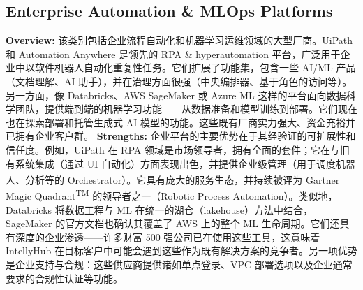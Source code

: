\documentclass[11pt, a4paper, oneside]{article}
\begin{document}
\subsection{Enterprise Automation \& MLOps Platforms}
\textbf{Overview:} 该类别包括企业流程自动化和机器学习运维领域的大型厂商。UiPath 和 Automation Anywhere 是领先的 RPA \& hyperautomation 平台，广泛用于企业中以软件机器人自动化重复性任务。它们扩展了功能集，包含一些 AI/ML 产品（文档理解、AI 助手），并在治理方面很强（中央编排器、基于角色的访问等）。另一方面，像 Databricks、AWS SageMaker 或 Azure ML 这样的平台面向数据科学团队，提供端到端的机器学习功能——从数据准备和模型训练到部署。它们现在也在探索部署和托管生成式 AI 模型的功能。这些既有厂商实力强大、资金充裕并已拥有企业客户群。
\newline\newline
\textbf{Strengths:} 企业平台的主要优势在于其经验证的可扩展性和信任度。例如，UiPath 在 RPA 领域是市场领导者，拥有全面的套件；它在与旧有系统集成（通过 UI 自动化）方面表现出色，并提供企业级管理（用于调度机器人、分析等的 Orchestrator）。它具有庞大的服务生态，并持续被评为 Gartner\textsuperscript{\textregistered} Magic Quadrant\textsuperscript{TM} 的领导者之一（Robotic Process Automation）\cite{uipathGartner}。类似地，Databricks 将数据工程与 ML 在统一的湖仓（lakehouse）方法中结合，SageMaker 的官方文档也确认其覆盖了 AWS 上的整个 ML 生命周期\cite{awsSagemaker}。它们还具有深度的企业渗透——许多财富 500 强公司已在使用这些工具，这意味着 IntellyHub 在目标客户中可能会遇到这些作为既有解决方案的竞争者。另一项优势是企业支持与合规：这些供应商提供诸如单点登录、VPC 部署选项以及企业通常要求的合规性认证等功能。
\newline\newline
\end{document}

